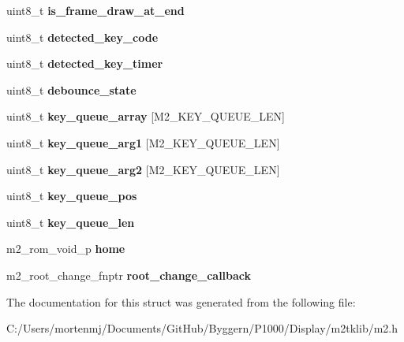 \begin{DoxyCompactItemize}
\item 
\hypertarget{struct__m2__struct_a39c5f329b390dc786f6e08d22192d513}{uint8\-\_\-t {\bfseries is\-\_\-frame\-\_\-draw\-\_\-at\-\_\-end}}\label{struct__m2__struct_a39c5f329b390dc786f6e08d22192d513}

\item 
\hypertarget{struct__m2__struct_a1a553f33c08f14a63a18783c5879ca1d}{uint8\-\_\-t {\bfseries detected\-\_\-key\-\_\-code}}\label{struct__m2__struct_a1a553f33c08f14a63a18783c5879ca1d}

\item 
\hypertarget{struct__m2__struct_a4379445d1c307991a2f482a5c4a30e72}{uint8\-\_\-t {\bfseries detected\-\_\-key\-\_\-timer}}\label{struct__m2__struct_a4379445d1c307991a2f482a5c4a30e72}

\item 
\hypertarget{struct__m2__struct_a9e1441621dea7ee97a36914ad15c69b8}{uint8\-\_\-t {\bfseries debounce\-\_\-state}}\label{struct__m2__struct_a9e1441621dea7ee97a36914ad15c69b8}

\item 
\hypertarget{struct__m2__struct_a916fba88ad3a48d320096f9b1e7e2e65}{uint8\-\_\-t {\bfseries key\-\_\-queue\-\_\-array} \mbox{[}M2\-\_\-\-K\-E\-Y\-\_\-\-Q\-U\-E\-U\-E\-\_\-\-L\-E\-N\mbox{]}}\label{struct__m2__struct_a916fba88ad3a48d320096f9b1e7e2e65}

\item 
\hypertarget{struct__m2__struct_a5a5132fcd7f6439dae887dab3fb50d29}{uint8\-\_\-t {\bfseries key\-\_\-queue\-\_\-arg1} \mbox{[}M2\-\_\-\-K\-E\-Y\-\_\-\-Q\-U\-E\-U\-E\-\_\-\-L\-E\-N\mbox{]}}\label{struct__m2__struct_a5a5132fcd7f6439dae887dab3fb50d29}

\item 
\hypertarget{struct__m2__struct_a9bf2181c9bbad14f600508fa3b3474be}{uint8\-\_\-t {\bfseries key\-\_\-queue\-\_\-arg2} \mbox{[}M2\-\_\-\-K\-E\-Y\-\_\-\-Q\-U\-E\-U\-E\-\_\-\-L\-E\-N\mbox{]}}\label{struct__m2__struct_a9bf2181c9bbad14f600508fa3b3474be}

\item 
\hypertarget{struct__m2__struct_a40ac31c23710be5fb2eaffb79c614b2f}{uint8\-\_\-t {\bfseries key\-\_\-queue\-\_\-pos}}\label{struct__m2__struct_a40ac31c23710be5fb2eaffb79c614b2f}

\item 
\hypertarget{struct__m2__struct_a7f7f6fd038907e474682af5f13230e28}{uint8\-\_\-t {\bfseries key\-\_\-queue\-\_\-len}}\label{struct__m2__struct_a7f7f6fd038907e474682af5f13230e28}

\item 
\hypertarget{struct__m2__struct_a2541918d6f66adb9affaa64a27cd0e07}{m2\-\_\-rom\-\_\-void\-\_\-p {\bfseries home}}\label{struct__m2__struct_a2541918d6f66adb9affaa64a27cd0e07}

\item 
\hypertarget{struct__m2__struct_a2baffd0bf96e8f376437ef5fe11a9cdc}{m2\-\_\-root\-\_\-change\-\_\-fnptr {\bfseries root\-\_\-change\-\_\-callback}}\label{struct__m2__struct_a2baffd0bf96e8f376437ef5fe11a9cdc}

\end{DoxyCompactItemize}


The documentation for this struct was generated from the following file\-:\begin{DoxyCompactItemize}
\item 
C\-:/\-Users/mortenmj/\-Documents/\-Git\-Hub/\-Byggern/\-P1000/\-Display/m2tklib/m2.\-h\end{DoxyCompactItemize}
